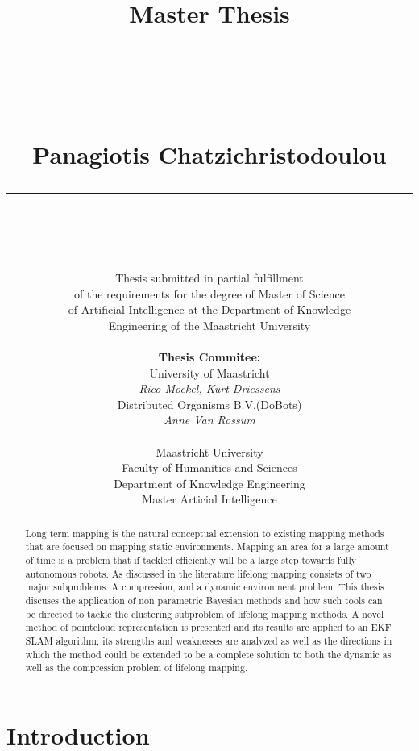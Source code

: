 \documentclass[twoside,hidelinks]{article}
\title{
\Huge{Master Thesis} \\
\noindent\rule{4cm}{0.4pt} \\
\vspace{5mm}
\huge{\selectfont{Towards lifelong mapping in pointclouds}}
\vspace{5mm} \\
\normalsize Panagiotis Chatzichristodoulou \\
\noindent\rule{4cm}{0.4pt} \\
\vspace{5mm}
\fontsize{24pt}{10pt}{Master Thesis DKE 09-16 }} %
\author{
\normalsize Thesis submitted in partial fulfillment\\
\normalsize  of the requirements for the degree of Master of Science \\
\normalsize of Artificial Intelligence at the Department of Knowledge \\
\normalsize  Engineering of the Maastricht University \\
\vspace{5mm} \\
\normalsize \textbf{Thesis Commitee:} \\ 
\normalsize University of Maastricht \\ %
\normalsize \textit{Rico Mockel, Kurt Driessens} \\
\normalsize Distributed Organisms B.V.(DoBots)\\
\normalsize \textit{Anne Van Rossum} \\
\vspace{0mm} \\
\normalsize Maastricht University \\
\normalsize Faculty of Humanities and Sciences \\ 
\normalsize Department of Knowledge Engineering \\
\normalsize Master Articial Intelligence \\
}
\begin{document}
\maketitle %

\thispagestyle{fancy} %

\newpage
\begin{abstract}

\noindent Long term mapping is the natural conceptual extension to existing mapping methods that are focused on mapping static environments. Mapping an area for a large amount of time is a problem that if tackled efficiently will be a large step towards fully autonomous robots. As discussed in the literature lifelong mapping consists of two major subproblems. A compression, and a dynamic environment problem. This thesis discuses the application of non parametric Bayesian methods and how such tools can be directed to tackle the clustering subproblem of lifelong mapping methods. A novel method of pointcloud representation is presented and its results are applied to an EKF SLAM algorithm; its strengths and weaknesses are analyzed as well as the directions in which the method could be extended to be a complete solution to both the dynamic as well as the compression problem of lifelong mapping.


\end{abstract}

 
\tableofcontents
\listoffigures
 
 

\newpage


\section{Introduction}
\label{sec:Intro}
\end{document}
